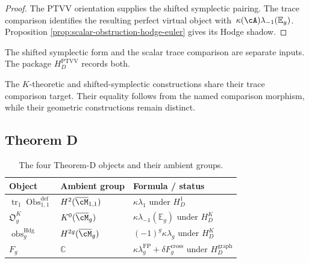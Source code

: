 \begin{proof}
The PTVV orientation supplies the shifted symplectic pairing.  The
trace comparison identifies the resulting perfect virtual object
with~$\kappa(\cA)\lambda_{-1}(\mathbb E_g)$.  Proposition
\ref{prop:scalar-obstruction-hodge-euler} gives its Hodge shadow.
\end{proof}

\begin{remark}
\label{rem:ptvv-aksz-chain-level-scope}
The shifted symplectic form and the scalar trace comparison are
separate inputs.  The package $H_D^{\mathrm{PTVV}}$ records both.
\end{remark}

\begin{remark}
\label{rem:ptvv-independence}
The $K$-theoretic and shifted-symplectic constructions share their
trace comparison target.  Their equality follows from the named
comparison morphism, while their geometric constructions remain
distinct.
\end{remark}

\subsection{Theorem D}
\label{subsec:obstruction-summary-table}

\begin{table}[ht]
\centering
\caption{The four Theorem-D objects and their ambient groups.}
\label{tab:obstruction-summary}
\begin{tabular}{lll}
\hline
Object & Ambient group & Formula / status \\
\hline
$\operatorname{tr}_1\operatorname{Obs}^{\mathrm{def}}_{1,1}$
& $H^2(\overline{\cM}_{1,1})$
& $\kappa\lambda_1$ under $H_D^1$ \\
$\mathfrak O_g^K$
& $K^0(\overline{\cM}_g)$
& $\kappa\lambda_{-1}(\mathbb E_g)$ under $H_D^K$ \\
$\operatorname{obs}^{\mathrm{Hdg}}_g$
& $H^{2g}(\overline{\cM}_g)$
& $(-1)^g\kappa\lambda_g$ under $H_D^K$ \\
$F_g$
& $\mathbb C$
& $\kappa\lambda_g^{\mathrm{FP}}+\delta F_g^{\mathrm{cross}}$
under $H_D^{\mathrm{graph}}$ \\
\hline
\end{tabular}
\end{table}

